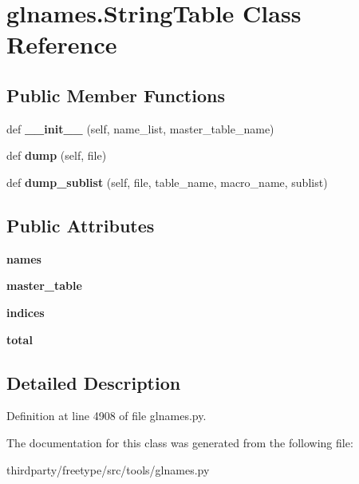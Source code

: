 \hypertarget{classglnames_1_1_string_table}{}\section{glnames.\+String\+Table Class Reference}
\label{classglnames_1_1_string_table}
\subsection*{Public Member Functions}
\begin{DoxyCompactItemize}
\item 
\mbox{\label{classglnames_1_1_string_table_a3d12cdad664f68b01175a98b237387e1}} 
def {\bfseries \+\_\+\+\_\+init\+\_\+\+\_\+} (self, name\+\_\+list, master\+\_\+table\+\_\+name)
\item 
\mbox{\label{classglnames_1_1_string_table_af565dc409c7fddd0dcbec79898db3b13}} 
def {\bfseries dump} (self, file)
\item 
\mbox{\label{classglnames_1_1_string_table_a0209c5e4db76ef223a9fc5f3ec13c908}} 
def {\bfseries dump\+\_\+sublist} (self, file, table\+\_\+name, macro\+\_\+name, sublist)
\end{DoxyCompactItemize}
\subsection*{Public Attributes}
\begin{DoxyCompactItemize}
\item 
\mbox{\label{classglnames_1_1_string_table_a7693ce7c17ce6297ebc355255e486fba}} 
{\bfseries names}
\item 
\mbox{\label{classglnames_1_1_string_table_a3ed806622242d87a4836e95b077e36bb}} 
{\bfseries master\+\_\+table}
\item 
\mbox{\label{classglnames_1_1_string_table_a8c7ed89485464cd3fadd0e40e363e204}} 
{\bfseries indices}
\item 
\mbox{\label{classglnames_1_1_string_table_ae508f23e95d6a2350a765909a7885389}} 
{\bfseries total}
\end{DoxyCompactItemize}


\subsection{Detailed Description}


Definition at line 4908 of file glnames.\+py.



The documentation for this class was generated from the following file\+:\begin{DoxyCompactItemize}
\item 
thirdparty/freetype/src/tools/glnames.\+py\end{DoxyCompactItemize}
